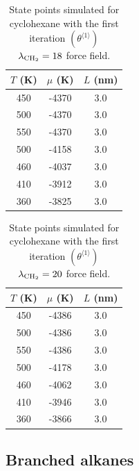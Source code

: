 \documentclass[journal=jctc,manuscript=article]{achemso}
\begin{document}
\begin{table}[htb!]
	\caption{State points simulated for cyclohexane with the first iteration $(\theta^{\langle1\rangle})$ $\lambda_{\rm CH_2} = 18$ force field.}
	\begin{center}
		\begin{tabular}{|c|c|c|}
			\hline
			$T$ (K) & $\mu$ (K) & $L$ (nm) \\ \hline
			450	&	-4370	&	3.0	\\
			500	&	-4370	&	3.0	\\
			550	&	-4370	&	3.0	\\
			500	&	-4158	&	3.0	\\
			460	&	-4037	&	3.0	\\
			410	&	-3912	&	3.0	\\
			360	&	-3825	&	3.0	\\
			\hline
		\end{tabular}
	\end{center}
\end{table}

\begin{table}[htb!]
	\caption{State points simulated for cyclohexane with the first iteration $(\theta^{\langle1\rangle})$ $\lambda_{\rm CH_2} = 20$ force field.}
	\begin{center}
		\begin{tabular}{|c|c|c|}
			\hline
			$T$ (K) & $\mu$ (K) & $L$ (nm) \\ \hline
			450	&	-4386	&	3.0	\\
			500	&	-4386	&	3.0	\\
			550	&	-4386	&	3.0	\\
			500	&	-4178	&	3.0	\\
			460	&	-4062	&	3.0	\\
			410	&	-3946	&	3.0	\\
			360	&	-3866	&	3.0	\\
			\hline
		\end{tabular}
	\end{center}
\end{table}

\newpage
\clearpage

\subsection{Branched alkanes}
\end{document}
